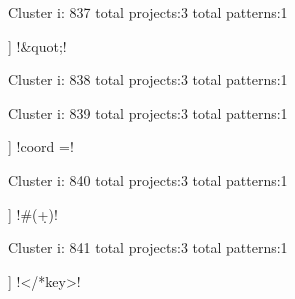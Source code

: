 Cluster i: 837
total projects:3
total patterns:1
\begin{multicols}{1}
\begin{description}[noitemsep,topsep=0pt]
\item [[3] ] \cverb!&quot;!
\end{description}
\end{multicols}







Cluster i: 838
total projects:3
total patterns:1
\begin{multicols}{1}
\begin{description}[noitemsep,topsep=0pt]
\item [[3] ] \cverb!\w+\(!
\end{description}
\end{multicols}







Cluster i: 839
total projects:3
total patterns:1
\begin{multicols}{1}
\begin{description}[noitemsep,topsep=0pt]
\item [[3] ] \cverb!coord =!
\end{description}
\end{multicols}







Cluster i: 840
total projects:3
total patterns:1
\begin{multicols}{1}
\begin{description}[noitemsep,topsep=0pt]
\item [[3] ] \cverb!#(\d+)!
\end{description}
\end{multicols}







Cluster i: 841
total projects:3
total patterns:1
\begin{multicols}{1}
\begin{description}[noitemsep,topsep=0pt]
\item [[3] ] \cverb!</*key>!
\end{description}
\end{multicols}







